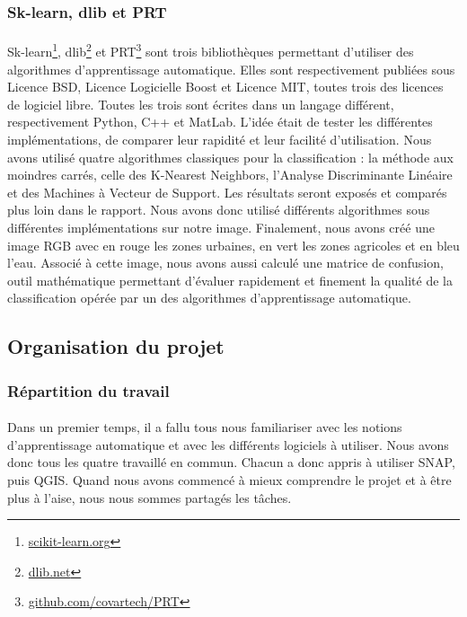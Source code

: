 \documentclass[a4paper,10pt]{article}
\begin{document}
\subsubsection{Sk-learn, dlib et PRT}
\paragraph{}
Sk-learn\footnote{\href{http://scikit-learn.org}{scikit-learn.org}}, dlib\footnote{\href{http://dlib.net}{dlib.net}} et PRT\footnote{\href{https://github.com/covartech/PRT}{github.com/covartech/PRT}} sont trois bibliothèques permettant d'utiliser des algorithmes d'apprentissage automatique. Elles sont respectivement publiées sous Licence BSD, Licence Logicielle Boost et Licence MIT, toutes trois des licences de logiciel libre. Toutes les trois sont écrites dans un langage différent, respectivement Python, C++ et MatLab. L'idée était de tester les différentes implémentations, de comparer leur rapidité et leur facilité d'utilisation. Nous avons utilisé quatre algorithmes classiques pour la classification : la méthode aux moindres carrés, celle des K-Nearest Neighbors, l'Analyse Discriminante Linéaire et des Machines à Vecteur de Support. Les résultats seront exposés et comparés plus loin dans le rapport. Nous avons donc utilisé différents algorithmes sous différentes implémentations sur notre image. Finalement, nous avons créé une image RGB avec en rouge les zones urbaines, en vert les zones agricoles et en bleu l'eau. Associé à cette image, nous avons aussi calculé une matrice de confusion, outil mathématique permettant d'évaluer rapidement et finement la qualité de la classification opérée par un des algorithmes d'apprentissage automatique.
\subsection{Organisation du projet}
\subsubsection{Répartition du travail}
\paragraph{}
Dans un premier temps, il a fallu tous nous familiariser avec les notions d'apprentissage automatique et avec les différents logiciels à utiliser. Nous avons donc tous les quatre travaillé en commun. Chacun a donc appris à utiliser SNAP, puis QGIS. Quand nous avons commencé à mieux comprendre le projet et à être plus à l'aise, nous nous sommes partagés les tâches.
\end{document}
